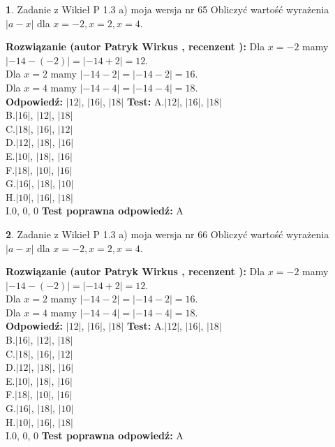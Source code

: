\documentclass[12pt, a4paper]{article}
\theoremstyle{definition} %
\newtheorem{zad}{}
\newcommand{\zadStart}[1]{\begin{zad}#1\newline}
\newcommand{\zadStop}{\end{zad}}
\newcommand{\rozwStart}[2]{\noindent \textbf{Rozwiązanie (autor #1 , recenzent #2): }\newline}
\newcommand{\rozwStop}{\newline}
\newcommand{\odpStart}{\noindent \textbf{Odpowiedź:}\newline}
\newcommand{\odpStop}{\newline}
\newcommand{\testStart}{\noindent \textbf{Test:}\newline}
\newcommand{\testStop}{\newline}
\newcommand{\kluczStart}{\noindent \textbf{Test poprawna odpowiedź:}\newline}
\newcommand{\kluczStop}{\newline}
\begin{document}
\zadStart{Zadanie z Wikieł P 1.3 a) moja wersja nr 65}
Obliczyć wartość wyrażenia $|a - x|$ dla $x=-2,x=2,x=4$.
\zadStop
\rozwStart{Patryk Wirkus}{}
Dla $x = -2$ mamy $|-14 - (-2)| = |-14 + 2| = 12$.\\
Dla $x = 2$ mamy $|-14 - 2| = |-14 - 2| = 16$.\\
Dla $x = 4$ mamy $|-14 - 4| = |-14 - 4| = 18$.\\
\rozwStop
\odpStart
$|12|$, $|16|$, $|18|$
\odpStop
\testStart
A.$|12|$, $|16|$, $|18|$\\
B.$|16|$, $|12|$, $|18|$\\
C.$|18|$, $|16|$, $|12|$\\
D.$|12|$, $|18|$, $|16|$\\
E.$|10|$, $|18|$, $|16|$\\
F.$|18|$, $|10|$, $|16|$\\
G.$|16|$, $|18|$, $|10|$\\
H.$|10|$, $|16|$, $|18|$\\
I.$0$, $0$, $0$
\testStop
\kluczStart
A
\kluczStop



\zadStart{Zadanie z Wikieł P 1.3 a) moja wersja nr 66}
Obliczyć wartość wyrażenia $|a - x|$ dla $x=-2,x=2,x=4$.
\zadStop
\rozwStart{Patryk Wirkus}{}
Dla $x = -2$ mamy $|-14 - (-2)| = |-14 + 2| = 12$.\\
Dla $x = 2$ mamy $|-14 - 2| = |-14 - 2| = 16$.\\
Dla $x = 4$ mamy $|-14 - 4| = |-14 - 4| = 18$.\\
\rozwStop
\odpStart
$|12|$, $|16|$, $|18|$
\odpStop
\testStart
A.$|12|$, $|16|$, $|18|$\\
B.$|16|$, $|12|$, $|18|$\\
C.$|18|$, $|16|$, $|12|$\\
D.$|12|$, $|18|$, $|16|$\\
E.$|10|$, $|18|$, $|16|$\\
F.$|18|$, $|10|$, $|16|$\\
G.$|16|$, $|18|$, $|10|$\\
H.$|10|$, $|16|$, $|18|$\\
I.$0$, $0$, $0$
\testStop
\kluczStart
A
\kluczStop
\end{document}
